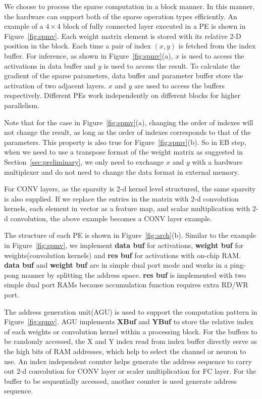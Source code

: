 We choose to process the sparse computation in a block manner. In this manner, the hardware can support both of the sparse operation types efficiently. An example of a $4\times 4$ block of fully connected layer executed in a PE is shown in Figure~\ref{fig:spmv}. Each weight matrix element is stored with its relative 2-D position in the block. Each time a pair of index $(x, y)$ is fetched from the index buffer. For inference, as shown in Figure~\ref{fig:spmv}(a), $x$ is used to access the activations in data buffer and $y$ is used to access the result. To calculate the gradient of the sparse parameters, data buffer and parameter buffer store the activation of two adjacent layers. $x$ and $y$ are used to access the buffers respectively. Different PEs work independently on different blocks for higher parallelism.

Note that for the case in Figure~\ref{fig:spmv}(a), changing the order of indexes will not change the result, as long as the order of indexes corresponds to that of the parameters. This property is also true for Figure~\ref{fig:spmv}(b). So in EB step, when we need to use a transpose format of the weight matrix as suggested in Section~\ref{sec:preliminary}, we only need to exchange $x$ and $y$ with a hardware multiplexer and do not need to change the data format in external memory. 

For CONV layers, as the sparsity is 2-d kernel level structured, the same sparsity is also supplied. If we replace the entries in the matrix with 2-d convolution kernels, each element in vector as a feature map, and scalar multiplication with 2-d convolution, the above example becomes a CONV layer example.

The structure of each PE is shown in Figure~\ref{fig:arch}(b). Similar to the example in Figure~\ref{fig:spmv}, we implement {\bf{data buf}} for activations, {\bf{weight buf}} for weights(convolution kernels) and {\bf{res buf}} for activations with on-chip RAM. {\bf{data buf}} and {\bf{weight buf}} are in simple dual port mode and works in a ping-pong manner by splitting the address space. {\bf{res buf}} is implemented with two simple dual port RAMs because accumulation function requires extra RD/WR port.

The address generation unit(AGU) is used to support the computation pattern in Figure~\ref{fig:spmv}. AGU implements {\bf{XBuf}} and {\bf{YBuf}} to store the relative index of each weights or convolution kernel within a processing block. For the buffers to be randomly accessed, the X and Y index read from index buffer directly serve as the high bits of RAM addresses, which help to select the channel or neuron to use. An index independent counter helps generate the address sequence to carry out 2-d convolution for CONV layer or scaler multiplication for FC layer. For the buffer to be sequentially accessed, another counter is used generate address sequence.

